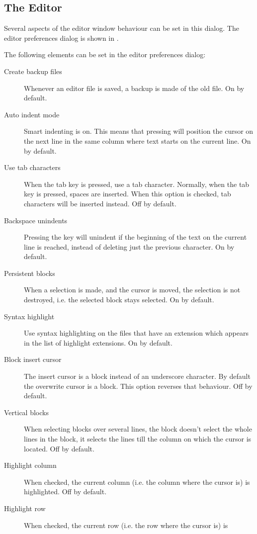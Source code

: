 \subsection{The Editor}
Several aspects of the editor window behaviour can be set in this dialog.
The editor preferences dialog is shown in .


The following elements can be set in the editor preferences dialog:
\begin{description}
\item[Create backup files]
Whenever an editor file is saved, a backup is made of the old file. On by
default.
\item[Auto indent mode] 
Smart indenting is on. This means that pressing  will position the 
cursor on the next line in the same column where text starts on the current
line. On by default.
\item[Use tab characters] 
When the tab key is pressed, use a tab character. Normally, when the tab key
is pressed, spaces are inserted. When this option is checked, tab characters 
will be inserted instead. Off by default.
\item[Backspace unindents]
Pressing the  key will unindent if the beginning of the text on
the current line is reached, instead of deleting just the previous
character. On by default.
\item[Persistent blocks]
When a selection is made, and the cursor is moved, the selection is not
destroyed, i.e. the selected block stays selected. On by default. 
\item[Syntax highlight]
Use syntax highlighting on the files that have an extension which appears in
the list of highlight extensions. On by default.
\item[Block insert cursor]
The insert cursor is a block instead of an underscore character. By default
the overwrite cursor is a block. This option reverses that behaviour. Off by
default.
\item[Vertical blocks]
When selecting blocks over several lines, the block doesn't select the whole
lines in the block, it selects the lines till the column on which the cursor
is located. Off by default.
\item[Highlight column]
When checked, the current column (i.e. the column where the cursor is) is
highlighted. Off by default.
\item[Highlight row]
When checked, the current row (i.e. the row where the cursor is) is

\end{description}
